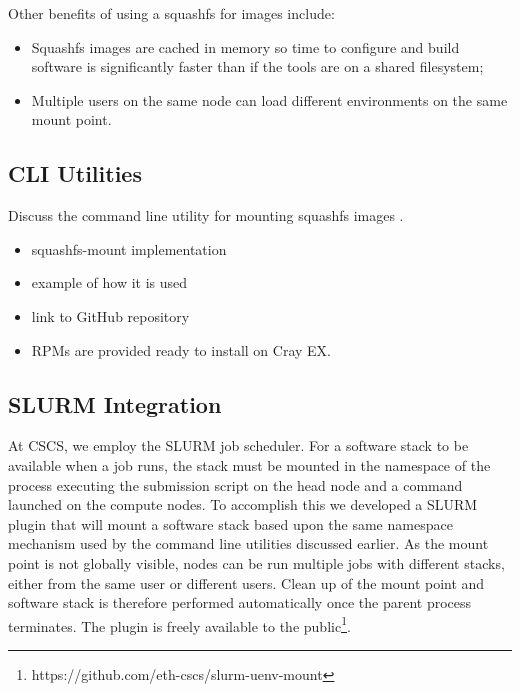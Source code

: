 Other benefits of using a squashfs for images include:
\begin{itemize}
    \item Squashfs images are cached in memory so time to configure and build software is significantly faster than if the tools are on a shared filesystem;
    \item Multiple users on the same node can load different environments on the same mount point.
\end{itemize}

\subsection{CLI Utilities}


Discuss the command line utility for mounting squashfs images .

\begin{itemize}
    \item squashfs-mount implementation
    \item example of how it is used
    \item link to GitHub repository
    \item RPMs are provided ready to install on Cray EX.
\end{itemize}

\subsection{SLURM Integration}


At CSCS, we employ the SLURM job scheduler.
For a software stack to be available when a job runs, the stack must be mounted in the namespace of the process executing the submission script on the head node and a command launched on the compute nodes.
To accomplish this we developed a SLURM plugin that will mount a software stack based upon the same namespace mechanism used by the command line utilities discussed earlier.
As the mount point is not globally visible, nodes can be run multiple jobs with different stacks, either from the same user or different users.
Clean up of the mount point and software stack is therefore performed automatically once the parent process terminates.
The plugin is freely available to the public\footnote{https://github.com/eth-cscs/slurm-uenv-mount}.

